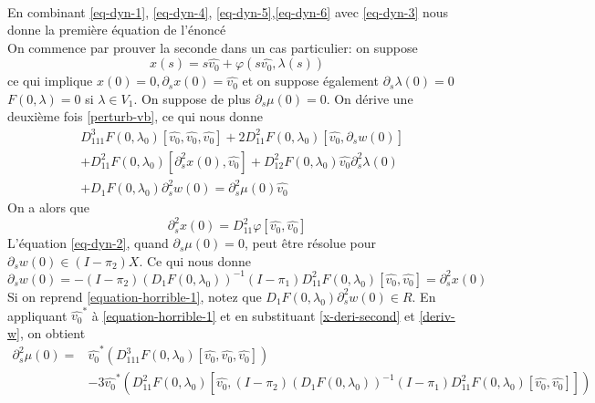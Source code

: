 \documentclass[memoire.tex]{subfiles}
\begin{document}
\begin{preuve}
\begin{equation}
\begin{aligned}
        \end{aligned}
    \end{equation}
    En combinant \eqref{eq-dyn-1}, \eqref{eq-dyn-4}, \ref{eq-dyn-5},\ref{eq-dyn-6} avec \eqref{eq-dyn-3} nous donne la première équation de l'énoncé\\
    On commence par prouver la seconde dans un cas particulier: on suppose
    \begin{equation*}
        x(s)=s\hat{v_0}+\varphi(s\hat{v_0},\lambda(s))
    \end{equation*}
    ce qui implique $x(0)=0,\partial_sx(0)=\hat{v_0}$ et  on suppose également $\partial_s\lambda(0)=0$ $F(0,\lambda)=0$ si $\lambda\in V_1$. On suppose de plus $\partial_s\mu(0)=0$. On dérive une deuxième fois \eqref{perturb-vb}, ce qui nous donne
    \begin{equation}\label{equation-horrible-1}
        \begin{aligned}
            &D^3_{111}F(0,\lambda_0)[\hat{v_0},\hat{v_0},\hat{v_0}]+2D^2_{11}F(0,\lambda_0)[\hat{v_0},\partial_sw(0)]\\
            &+D^2_{11}F(0,\lambda_0)[\partial^2_s x(0),\hat{v_0}]+D^2_{12}F(0,\lambda_0)\hat{v_0}\partial^2_s\lambda(0)\\
            &+D_1F(0,\lambda_0)\partial^2_sw(0)=\partial^2_s\mu(0)\hat{v_0}
        \end{aligned}
    \end{equation}
    On a alors que
    \begin{equation}\label{x-deri-second}
        \partial^2_sx(0)=D^2_{11}\varphi[\hat{v_0},\hat{v_0}]
    \end{equation}
    L'équation \eqref{eq-dyn-2}, quand $\partial_s\mu(0)=0$, peut être résolue pour $\partial_sw(0)\in (I-\pi_2)X$.
    Ce qui nous donne
    \begin{equation*}\label{deriv-w}
        \partial_s w(0)=-(I-\pi_2)(D_1F(0,\lambda_0))^{-1}(I-\pi_1)D^2_{11}F(0,\lambda_0)[\hat{v_0},\hat{v_0}]=\partial^2_sx(0)
    \end{equation*}
    Si on reprend \eqref{equation-horrible-1}, notez que 
    $D_1F(0,\lambda_0)\partial^2_sw(0)\in R$. En appliquant $\hat{v_0}^*$ à \eqref{equation-horrible-1} et en substituant \eqref{x-deri-second} et \eqref{deriv-w}, on obtient
    \begin{equation}
        \begin{aligned}
            \partial^2_s\mu(0)=&\hat{v_0}^*(D^3_{111}F(0,\lambda_0)[\hat{v_0},\hat{v_0},\hat{v_0}])
            \\&- 3\hat{v_0}^*\left(D^2_{11}F(0,\lambda_0)[\hat{v_0},(I-\pi_2)(D_1F(0,\lambda_0))^{-1}(I-\pi_1)D^2_{11}F(0,\lambda_0)[\hat{v_0},\hat{v_0}]]\right)\\

\end{aligned}
\end{equation}
\end{preuve}
\end{document}
